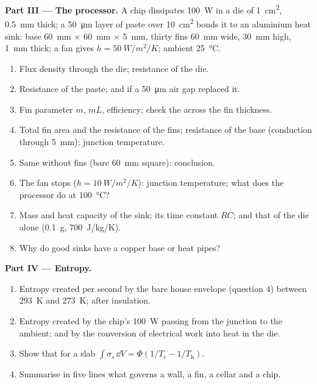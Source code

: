 \begin{problem}
\textbf{Part III --- The processor.}
A chip dissipates \qty{100}{W} in a die of \qty{1}{cm^2}, \qty{0.5}{mm}
thick; a \qty{50}{\micro m} layer of paste over \qty{10}{cm^2} bonds it
to an aluminium heat sink: base \qty{60}{mm} $\times$ \qty{60}{mm} $\times$
\qty{5}{mm}, thirty fins \qty{60}{mm} wide, \qty{30}{mm} high, \qty{1}{mm}
thick; a fan gives $h = \qty{50}{W/m^2/K}$; ambient \qty{25}{\celsius}.
\begin{enumerate}[resume]
  \item Flux density through the die; resistance of the die.
  \item Resistance of the paste; and if a \qty{50}{\micro m} air gap
        replaced it.
  \item Fin parameter $m$, $mL$, efficiency; check the 
        across the fin thickness.
  \item Total fin area and the resistance of the fins; resistance of
        the base (conduction through \qty{5}{mm}); junction temperature.
  \item Same without fins (bare \qty{60}{mm} square): conclusion.
  \item The fan stops ($h = \qty{10}{W/m^2/K}$): junction temperature;
        what does the processor do at \qty{100}{\celsius}?
  \item Mass and heat capacity of the sink; its time constant $RC$;
        and that of the die alone (\qty{0.1}{g}, \qty{700}{J/kg/K}).
  \item Why do good sinks have a copper base or heat pipes?
\end{enumerate}

\textbf{Part IV --- Entropy.}
\begin{enumerate}[resume]
  \item Entropy created per second by the bare house envelope
        (question 4) between \qty{293}{K} and \qty{273}{K}; after
        insulation.
  \item Entropy created by the chip's \qty{100}{W} passing from the
        junction to the ambient; and by the conversion of electrical
        work into heat in the die.
  \item Show that for a slab $\int\sigma_s\,\dd V = \Phi(1/T_{\text{c}} -
        1/T_{\text{h}})$.
  \item Summarise in five lines what governs a wall, a fin, a cellar
        and a chip.
\end{enumerate}
\end{problem}
